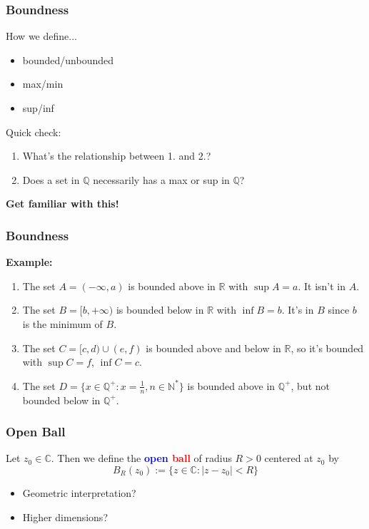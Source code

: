 \documentclass{beamer}
\begin{document}
\begin{frame}
    \frametitle{Boundness}
    How we define...\\
    \begin{itemize}
        \item bounded/unbounded
        \item max/min
        \item sup/inf
    \end{itemize}
    \begin{block}{Quick check:}
    \begin{enumerate}
        \item What's the relationship between 1. and 2.?
        \item Does a set in $\mathbb{Q}$ necessarily has a max or sup in $\mathbb{Q}$?
    \end{enumerate}
    \end{block}
    \vspace{1em}
    \textbf{Get familiar with this!}
\end{frame}
\begin{frame}
    \frametitle{Boundness}
\textbf{Example:}\\
\begin{enumerate}
    \item The set $A=(-\infty, a)$ is bounded above in $\mathbb{R}$ with $\sup A=a$. It isn't in $A$.
    \item The set $B=[b,+\infty)$ is bounded below in $\mathbb{R}$ with $\inf B=b$. It's in $B$ since $b$ is the minimum of $B$.
    \item The set $C=[c,d)\cup(e,f)$ is bounded above and below in $\mathbb{R}$, so it's bounded with $\sup C=f$, $\inf C=c$.
    \item The set $D=\{x\in \mathbb{Q}^+: x=\frac{1}{n}, n\in \mathbb{N}^*\}$ is bounded above in $\mathbb{Q}^+$, but not bounded 
        below in $\mathbb{Q}^+$.
\end{enumerate}
\end{frame}
\begin{frame}
    \frametitle{Open Ball}
    Let $z_0 \in \mathbb{C}$. Then we define the \textbf{\textcolor{blue}{open} \textcolor{red}{ball}} of radius 
    $R>0$ centered at $z_0$ by
    $$B_R(z_0):=\{z \in \mathbb{C} :|z-z_0|<R\}$$
    \begin{itemize}
        \item Geometric interpretation?
        \item Higher dimensions?
    \end{itemize}
\end{frame}
\end{document}
